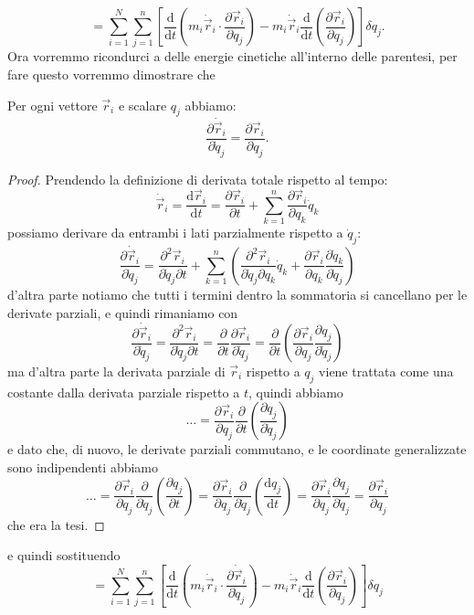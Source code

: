 \documentclass[11pt]{scrartcl}
\newcommand{\dif}{\text{d}}
\newcommand{\posit}{\vec{r}}
\newcommand{\veloc}{\dot{\vec{r}}}
\begin{document}
	$$=\sum_{i=1}^{N}\sum_{j=1}^{n}\left[\frac{\dif}{\dif t}\left(m_i\veloc_i\cdot\frac{\partial \posit_i}{\partial q_j}\right)-m_i\veloc_i\frac{\dif}{\dif t}\left(\frac{\partial \posit_i}{\partial q_j}\right)\right]\delta q_j.$$
	Ora vorremmo ricondurci a delle energie cinetiche all'interno delle parentesi, per fare questo vorremmo dimostrare che
	\begin{lemma}
		Per ogni vettore $\posit_i$ e scalare $q_j$ abbiamo:
		$$\frac{\partial \veloc_i}{\partial \dot{q}_j}=\frac{\partial \posit_i}{\partial q_j}.$$
	\end{lemma}
	\begin{proof}
		Prendendo la definizione di derivata totale rispetto al tempo:
		$$\veloc_i=\frac{\dif \posit_i}{\dif t}=\frac{\partial \posit_i}{\partial t}+\sum_{k=1}^{n}\frac{\partial \posit_i}{\partial q_k}\dot{q}_k$$
		possiamo derivare da entrambi i lati parzialmente rispetto a $\dot{q}_j$:
		$$\frac{\partial \veloc_i}{\partial \dot{q}_j}=\frac{\partial^2\posit_i}{\partial \dot{q}_j\partial t}+\sum_{k=1}^{n}\left(\frac{\partial^2 \posit_i}{\partial \dot{q}_j \partial q_k}\dot{q}_k+\frac{\partial \posit_i}{\partial q_k}\frac{\partial \dot{q}_k}{\partial \dot{q}_j}\right)$$
		d'altra parte notiamo che tutti i termini dentro la sommatoria si cancellano per le derivate parziali, e quindi rimaniamo con
		$$\frac{\partial \veloc_i}{\partial \dot{q}_j}=\frac{\partial^2\posit_i}{\partial \dot{q}_j\partial t}=\frac{\partial}{\partial t}\frac{\partial \posit_i}{\partial \dot{q}_j}=\frac{\partial}{\partial t}\left(\frac{\partial \posit_i}{\partial q_j}\frac{\partial q_j}{\partial \dot{q}_j}\right)$$
		ma d'altra parte la derivata parziale di $\posit_i$ rispetto a $q_j$ viene trattata come una costante dalla derivata parziale rispetto a $t$, quindi abbiamo
		$$\dots =\frac{\partial \posit_i}{\partial q_j}\frac{\partial}{\partial t}\left(\frac{\partial q_j}{\partial \dot{q}_j}\right)$$
		e dato che, di nuovo, le derivate parziali commutano, e le coordinate generalizzate sono indipendenti abbiamo
		$$\dots=\frac{\partial \posit_i}{\partial q_j}\frac{\partial}{\partial \dot{q}_j}\left(\frac{\partial q_j}{\partial t}\right)=\frac{\partial \posit_i}{\partial q_j}\frac{\partial}{\partial \dot{q}_j}\left(\frac{\dif q_j}{\dif t}\right)=\frac{\partial \posit_i}{\partial q_j} \frac{\partial \dot{q}_j}{\partial \dot{q}_j}=\frac{\partial \posit_i}{\partial q_j}$$
		che era la tesi.
	\end{proof}
	e quindi sostituendo 
	$$=\sum_{i=1}^{N}\sum_{j=1}^{n}\left[\frac{\dif}{\dif t}\left(m_i\veloc_i\cdot\frac{\partial \veloc_i}{\partial \dot{q}_j}\right)-m_i\veloc_i\frac{\dif}{\dif t}\left(\frac{\partial \posit_i}{\partial q_j}\right)\right]\delta q_j$$
\end{document}
